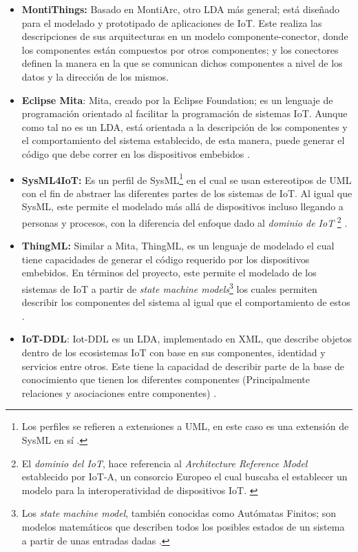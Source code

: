 \begin{itemize}
	\item \textbf{MontiThings:} Basado en MontiArc, otro LDA más general; está diseñado para el modelado y prototipado de aplicaciones de IoT. Este realiza las descripciones de sus arquitecturas en un modelo componente-conector, donde los componentes están compuestos por otros componentes; y los conectores definen la manera en la que se comunican dichos componentes a nivel de los datos y la dirección de los mismos. \cite{MontiThings, MontiThingsRepo}
	\item \textbf{Eclipse Mita}: Mita, creado por la Eclipse Foundation; es un lenguaje de programación orientado al facilitar la programación de sistemas IoT. Aunque como tal no es un LDA, está orientada a la descripción de los componentes y el comportamiento del sistema establecido, de esta manera, puede generar el código que debe correr en los dispositivos embebidos \cite{Mita}.
	\item \textbf{SysML4IoT:} Es un perfil de SysML\footnote{Los perfiles se refieren a extensiones a UML, en este caso es una extensión de SysML en sí \cite{Charles2007}.} en el cual se usan estereotipos de UML con el fin de abstraer las diferentes partes de los sistemas de IoT. Al igual que SysML, este permite el modelado más allá de dispositivos incluso llegando a personas y procesos, con la diferencia del enfoque dado al \textit{dominio de IoT} \footnote{El \textit{dominio del IoT}, hace referencia al \textit{Architecture Reference Model} establecido por IoT-A, un consorcio Europeo el cual buscaba el establecer un modelo para la interoperatividad de dispositivos IoT. \cite{IoTA2014}} \cite{SysML4IoT2016}.
	\item \textbf{ThingML:} Similar a Mita, ThingML, es un lenguaje de modelado el cual tiene capacidades de generar el código requerido por los dispositivos embebidos. En términos del proyecto, este permite el modelado de los sistemas de IoT a partir de \textit{state machine models}\footnote{Los \textit{state machine model}, también conocidas como Autómatas Finitos; son modelos matemáticos que describen todos los posibles estados de un sistema a partir de unas entradas dadas \cite{StateMachine2023}. } los cuales permiten describir los componentes del sistema al igual que el comportamiento de estos \cite{ThingML2016}.
	\item \textbf{IoT-DDL}: Iot-DDL es un LDA, implementado en XML, que describe objetos dentro de los ecosistemas IoT con base en sus componentes, identidad y servicios entre otros. Este tiene la capacidad de describir parte de la base de conocimiento que tienen los diferentes componentes (Principalmente relaciones y asociaciones entre componentes) \cite{Ahmed2018}.
\end{itemize}


